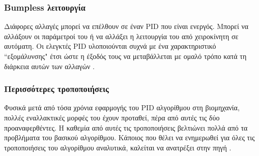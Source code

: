 \subsubsection{Bumpless λειτουργία}
Διάφορες αλλαγές μπορεί να επέλθουν σε έναν PID που είναι ενεργός. Μπορεί να αλλάξουν οι παράμετροί του ή να αλλάξει η λειτουργία του από χειροκίνητη σε αυτόματη. Οι ελεγκτές PID υλοποιούνται συχνά με ένα χαρακτηριστικό ``εξομάλυνσης" έτσι ώστε η έξοδός τους να μεταβάλλεται με ομαλό τρόπο κατά τη διάρκεια αυτών των αλλαγών \cite{douglas}.

\subsubsection{Περισσότερες τροποποιήσεις}
Φυσικά μετά από τόσα χρόνια εφαρμογής του PID αλγορίθμου στη βιομηχανία, πολλές εναλλακτικές μορφές του έχουν προταθεί, πέρα από αυτές τις δύο προαναφερθέντες. Η καθεμία από αυτές τις τροποποιήσεις βελτιώνει πολλά από τα προβλήματα του βασικού αλγορίθμου. Κάποιος που θέλει να ενημερωθεί για όλες τις τροποποιήσεις του αλγορίθμου αναλυτικά, καλείται να ανατρέξει στην πηγή \cite{astrom}.

%


